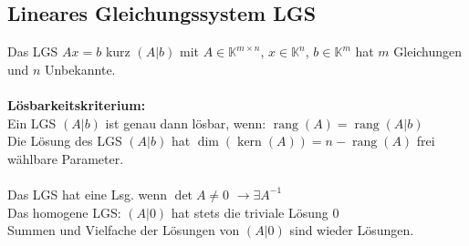 \documentclass[german, 6pt]{latex4ei/latex4ei_sheet}
\DeclareMathOperator{\rang}{rang}
\DeclareMathOperator{\Kern}{kern}
\begin{document}
\subsection{Lineares Gleichungssystem LGS}
Das LGS $Ax=b$ kurz $(A|b)$ mit $A\in \mathbb K^{m\times n}$, $x\in \mathbb K^n$, $b\in \mathbb K^m$ hat $m$ Gleichungen und $n$ Unbekannte.\\
\\
\textbf{Lösbarkeitskriterium:}\\
Ein LGS $(A|b)$ ist genau dann lösbar, wenn: $\rang(A)=\rang(A|b)$\\
Die Lösung des LGS $(A|b)$ hat $\dim(\Kern(A)) = n-\rang(A)$ frei wählbare Parameter.\\
\\
Das LGS hat eine Lsg. wenn $\det A \not= 0$ \quad $\rightarrow \exists A^{-1}$ \\
Das homogene LGS: $(A|0)$ hat stets die triviale Lösung $0$\\
Summen und Vielfache der Lösungen von $(A|0)$ sind wieder Lösungen.
\end{document}
